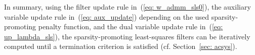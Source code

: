 \documentclass[10pt]{IEEEtran}
\begin{document}
  In summary, using the filter update rule in~(\ref{eq: w_admm_sls0}), the auxiliary variable update rule in~(\ref{eq: aux_update}) depending on the used sparsity-promoting penalty function, and the dual variable update rule in~(\ref{eq: up_lambda_sls}), the sparsity-promoting least-squares filters can be iteratively computed until a termination criterion is satisfied (cf. Section~\ref{sec: acsys}).
  
\end{document}
